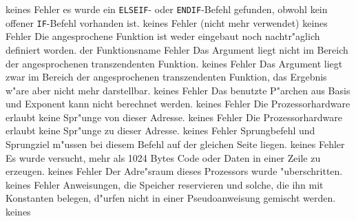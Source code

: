 \documentclass[12pt,a4paper,twoside]{report}
\newcommand{\tty}[1]{{\tt #1}}
\begin{document}
{\begin{description}
               {keines}
               {Fehler}
               {es wurde ein \tty{ELSEIF}- oder \tty{ENDIF}-Befehl gefunden,
                obwohl kein offener \tty{IF}-Befehl vorhanden ist.}
               {keines}
               {Fehler}
               {(nicht mehr verwendet)}
               {keines}
               {Fehler}
               {Die angesprochene Funktion ist weder eingebaut
                noch nachtr"aglich definiert worden.}
               {der Funktionsname}
               {Fehler}
               {Das Argument liegt nicht im Bereich der
                angesprochenen transzendenten Funktion.}
               {keines}
               {Fehler}
               {Das Argument liegt zwar im Bereich der
                angesprochenen transzendenten Funktion, das Ergebnis
                w"are aber nicht mehr darstellbar.}
               {keines}
               {Fehler}
               {Das benutzte P"archen aus Basis und Exponent
                kann nicht berechnet werden.}
               {keines}
               {Fehler}
               {Die Prozessorhardware erlaubt keine
                Spr"unge von dieser Adresse.}
               {keines}
               {Fehler}
               {Die Prozessorhardware erlaubt keine
                Spr"unge zu dieser Adresse.}
               {keines}
               {Fehler}
               {Sprungbefehl und Sprungziel m"ussen bei diesem
                Befehl auf der gleichen Seite liegen.}
               {keines}
               {Fehler}
               {Es wurde versucht, mehr als 1024 Bytes Code oder
                Daten in einer Zeile zu erzeugen.}
               {keines}
               {Fehler}
               {Der Adre"sraum dieses Prozessors wurde
                "uberschritten.}
               {keines}
               {Fehler}
               {Anweisungen, die Speicher reservieren und solche,
                die ihn mit Konstanten belegen, d"urfen nicht in einer
                Pseudoanweisung gemischt werden.}
               {keines}

\end{description}}
\end{document}

